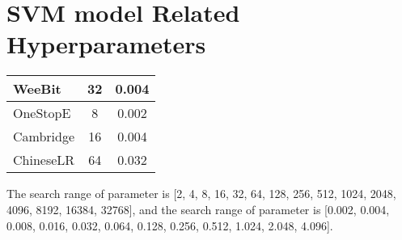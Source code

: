 \documentclass[11pt]{article}
\begin{document}
\section{SVM model Related Hyperparameters}
\begin{center}
\small
{}
\tabletail{\hline\hline}
\tablelasttail{\hline\hline}
\begin{supertabular}{p{3cm}|cc}
WeeBit          & 32    & 0.004 \\
\hline
OneStopE        & 8     & 0.002 \\
\hline
Cambridge       & 16    & 0.004 \\
\hline
ChineseLR       & 64    & 0.032 \\
\end{supertabular}
\end{center}
The search range of parameter  is [2, 4, 8, 16, 32, 64, 128, 256, 512, 1024, 2048, 4096, 8192, 16384, 32768], and the search range of parameter  is [0.002, 0.004, 0.008, 0.016, 0.032, 0.064, 0.128, 0.256, 0.512, 1.024, 2.048, 4.096].
\end{document}
